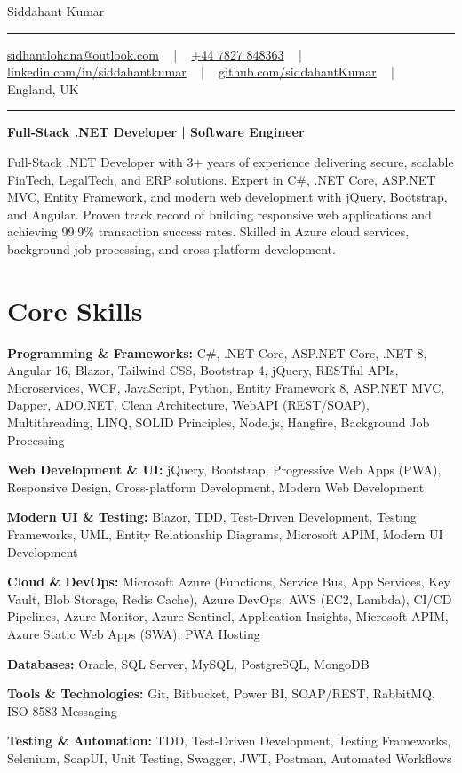 \documentclass[letterpaper,10pt]{article}
\newcommand{\documentTitle}[2]{
  \begin{center}
    \vspace*{-0.3in}
    {\Huge\color{accentTitle} #1}
    \vspace{8pt}
    {\color{accentLine} \hrule}
    \vspace{2pt}
    \footnotesize{#2}
    \vspace{2pt}
    {\color{accentLine} \hrule}
  \end{center}
}
\newenvironment{resume_list}{
  \vspace{-7pt}
  \begin{itemize}[itemsep=-2px, parsep=1pt, leftmargin=30pt]
}{
  \end{itemize}
}
\begin{document}
\documentTitle{Siddahant Kumar}{
\vspace{0.1cm}
\href{mailto:sidhantlohana@outlook.com}{sidhantlohana@outlook.com} ~ | ~
\href{tel:+447827848363}{+44 7827 848363} ~ | ~
\href{https://www.linkedin.com/in/siddahantkumar/}{linkedin.com/in/siddahantkumar} ~ | ~
\href{https://github.com/siddahantKumar}{github.com/siddahantKumar} ~ | ~
England, UK
}

\begin{center}
\textbf{Full-Stack .NET Developer | Software Engineer}
\end{center}

Full-Stack .NET Developer with 3+ years of experience delivering secure, scalable FinTech, LegalTech, and ERP solutions. Expert in C\#, .NET Core, ASP.NET MVC, Entity Framework, and modern web development with jQuery, Bootstrap, and Angular. Proven track record of building responsive web applications and achieving 99.9\% transaction success rates. Skilled in Azure cloud services, background job processing, and cross-platform development.


\section{Core Skills}

\begin{resume_list}
    \item \textbf{Programming \& Frameworks:} C\#, .NET Core, ASP.NET Core, .NET 8, Angular 16, Blazor, Tailwind CSS, Bootstrap 4, jQuery, RESTful APIs, Microservices, WCF, JavaScript, Python, Entity Framework 8, ASP.NET MVC, Dapper, ADO.NET, Clean Architecture, WebAPI (REST/SOAP), Multithreading, LINQ, SOLID Principles, Node.js, Hangfire, Background Job Processing
    \item \textbf{Web Development \& UI:} jQuery, Bootstrap, Progressive Web Apps (PWA), Responsive Design, Cross-platform Development, Modern Web Development
    \item \textbf{Modern UI \& Testing:} Blazor, TDD, Test-Driven Development, Testing Frameworks, UML, Entity Relationship Diagrams, Microsoft APIM, Modern UI Development
    \item \textbf{Cloud \& DevOps:} Microsoft Azure (Functions, Service Bus, App Services, Key Vault, Blob Storage, Redis Cache), Azure DevOps, AWS (EC2, Lambda), CI/CD Pipelines, Azure Monitor, Azure Sentinel, Application Insights, Microsoft APIM, Azure Static Web Apps (SWA), PWA Hosting
    \item \textbf{Databases:} Oracle, SQL Server, MySQL, PostgreSQL, MongoDB
    \item \textbf{Tools \& Technologies:} Git, Bitbucket, Power BI, SOAP/REST, RabbitMQ, ISO-8583 Messaging
    \item \textbf{Testing \& Automation:} TDD, Test-Driven Development, Testing Frameworks, Selenium, SoapUI, Unit Testing, Swagger, JWT, Postman, Automated Workflows
\end{resume_list}
\end{document}
